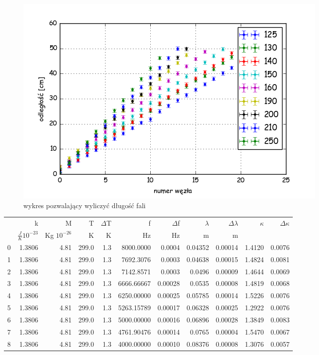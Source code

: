 \documentclass[a4paper,10pt]{article}
\begin{document}
\begin{figure}[H]
  \includegraphics{./Kappa.png}
  \caption{wykres pozwalający wyliczyć długość fali}
  \label{}
\end{figure}
\begin{tabular}{lrrrrrrrrrr}
\toprule
{} &             k &             M &      T &  $\Delta$T &            f &  $\Delta$f &  $\lambda$ &  $\Delta \lambda$ &  $ \kappa$ &  $\Delta \kappa$ \\
{} & $\frac{J}{K} 10^{-23}$ & Kg $10^{-26}$ & K & K & Hz & Hz & m & m &&\\
\midrule
0 &  1.3806 &  4.81 &  299.0 &   1.3 &  8000.0000 &   0.0004 &   0.04352 &     0.00014 &   1.4120 &   0.0076 \\
1 &  1.3806 &  4.81 &  299.0 &   1.3 &  7692.3076 &   0.0003 &   0.04638 &     0.00015 &   1.4824 &   0.0081 \\
2 &  1.3806 &  4.81 &  299.0 &   1.3 &  7142.8571 &   0.0003 &   0.0496 &      0.00009 &   1.4644 &   0.0069 \\
3 &  1.3806 &  4.81 &  299.0 &   1.3 &  6666.66667 &   0.00028 &   0.0535 &      0.00008 &   1.4819 &   0.0068 \\
4 &  1.3806 &  4.81 &  299.0 &   1.3 &  6250.00000 &   0.00025 &   0.05785 &     0.00014 &    1.5226 &   0.0076 \\
5 &  1.3806 &  4.81 &  299.0 &   1.3 &  5263.15789 &   0.00017 &   0.06328 &     0.00025 &    1.2922 &   0.0076 \\
6 &  1.3806 &  4.81 &  299.0 &   1.3 &  5000.00000 &   0.00016 &   0.06896 &     0.00028 &    1.3849 &   0.0083 \\
7 &  1.3806 &  4.81 &  299.0 &   1.3 &  4761.90476 &   0.00014 &   0.0765 &      0.00004 &    1.5470 &   0.0067 \\
8 &  1.3806 &  4.81 &  299.0 &   1.3 &  4000.00000 &   0.00010 &   0.08376 &      0.00008 &    1.3076 &   0.0057 \\
\bottomrule
\end{tabular}
\end{document}
